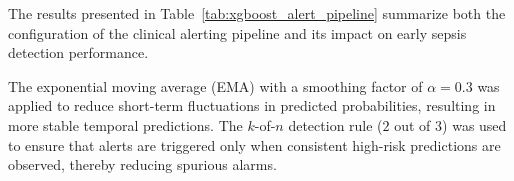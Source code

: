 \documentclass[conference]{IEEEtran}
\begin{document}
\begin{table}[H]
\centering
\caption{Clinical alerting pipeline parameters and achieved performance for the XGBoost model.}
\label{tab:xgboost_alert_pipeline}

\renewcommand{\arraystretch}{1.3}


\end{table}
The results presented in Table~\ref{tab:xgboost_alert_pipeline} summarize both the configuration of the clinical alerting pipeline and its impact on early sepsis detection performance.

The exponential moving average (EMA) with a smoothing factor of $\alpha = 0.3$ was applied to reduce short-term fluctuations in predicted probabilities, resulting in more stable temporal predictions. The $k$-of-$n$ detection rule ($2$ out of $3$) was used to ensure that alerts are triggered only when consistent high-risk predictions are observed, thereby reducing spurious alarms.
\end{document}

